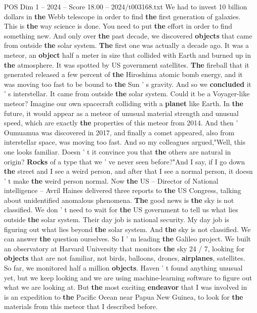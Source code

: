 \begin{textsample}{POS Dim 1 – 2024 – Score 18.00 – 2024/t003168.txt}
We had to invest 10 billion dollars in \textbf{the} Webb telescope in order to find \textbf{the} first generation of galaxies.
This is \textbf{the} way science is done.
You need to put \textbf{the} effort in order to find something new.
And only over \textbf{the} past decade, we discovered \textbf{objects} that came from outside \textbf{the} solar system. \textbf{The} first one was actually a decade ago.
It was a meteor, an \textbf{object} half a meter in size that collided with Earth and burned up in \textbf{the} atmosphere.
It was spotted by US government satellites. \textbf{The} fireball that it generated released a few percent of \textbf{the} Hiroshima atomic bomb energy, and it was moving too fast to be bound to \textbf{the} Sun ' s gravity.
And so we \textbf{concluded} it ' s interstellar.
It came from outside \textbf{the} solar system.
Could it be a Voyager-like meteor?
Imagine our own spacecraft colliding with a \textbf{planet} like Earth.
In \textbf{the} future, it would appear as a meteor of unusual material strength and unusual speed, which are exactly \textbf{the} properties of this meteor from 2014.
And then ' Oumuamua was discovered in 2017, and finally a comet appeared, also from interstellar space, was moving too fast.
And so my colleagues argued,"Well, this one looks familiar.
Doesn ' t it convince you that \textbf{the} others are natural in origin? \textbf{Rocks} of a type that we ' ve never seen before?"And I say, if I go down \textbf{the} street and I see a weird person, and after that I see a normal person, it doesn ' t make \textbf{the} weird person normal.
Now \textbf{the} US -- Director of National intelligence -- Avril Haines delivered three reports to \textbf{the} US Congress, talking about unidentified anomalous phenomena. \textbf{The} good news is \textbf{the} sky is not classified.
We don ' t need to wait for \textbf{the} US government to tell us what lies outside \textbf{the} solar system.
Their day job is national security.
My day job is figuring out what lies beyond \textbf{the} solar system.
And \textbf{the} sky is not classified.
We can answer \textbf{the} question ourselves.
So I ' m leading \textbf{the} Galileo project.
We built an observatory at Harvard University that monitors \textbf{the} sky 24 / 7, looking for \textbf{objects} that are not familiar, not birds, balloons, drones, \textbf{airplanes}, satellites.
So far, we monitored half a million \textbf{objects}.
Haven ' t found anything unusual yet, but we keep looking and we are using machine-learning software to figure out what we are looking at.
But \textbf{the} most exciting \textbf{endeavor} that I was involved in is an expedition to \textbf{the} Pacific Ocean near Papua New Guinea, to look for \textbf{the} materials from this meteor that I described before.

\end{textsample}
